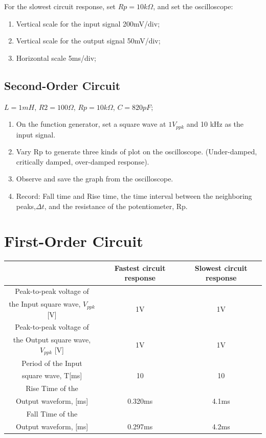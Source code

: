 \documentclass{article}
\begin{document}
For the slowest circuit response, set $Rp=10k\Omega$, and set the oscilloscope:
\begin{enumerate}
	\item Vertical scale for the input signal 200mV/div;
	\item  Vertical scale for the output signal 50mV/div;
	\item  Horizontal scale 5ms/div;
\end{enumerate}
\subsection{Second-Order Circuit}
$L=1mH$, $R2=100\Omega$, $Rp=10k\Omega$, $C=820pF$;
\begin{enumerate}
	\item On the function generator, set a square wave at $1V_{ppk}$ and 10 kHz as the input
	signal.
	\item Vary Rp to generate three kinds of plot on the oscilloscope. (Under-damped,
	critically damped, over-damped response).
	\item Observe and save the graph from the oscilloscope.
	\item Record: Fall time and Rise time, the time interval between the neighboring peaks,$\Delta t$,
	and the resistance of the potentiometer, Rp.
\end{enumerate}
\section{First-Order Circuit}
\begin{tabular}{|c|c|c|}
	\hline 
	& Fastest circuit response&Slowest circuit response  \\ 
	\hline 
	Peak-to-peak voltage of \\the Input square wave, $V_{ppk}$ [V]&1V  &1V  \\ 
	\hline 
	Peak-to-peak voltage of \\the Output square wave, $V_{ppk}$ [V]&1V  &1V  \\ 
	\hline 
	Period of the Input \\square wave, T[ms]& 10 & 10 \\ 
	\hline 
	Rise Time of the \\Output waveform, [ms]& 0.320ms & 4.1ms \\ 
	\hline 
	Fall Time of the \\Output waveform, [ms]& 0.297ms & 4.2ms \\ 
	\hline 
\end{tabular} 
\end{document}
